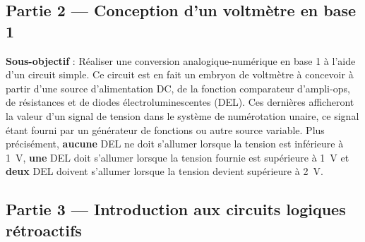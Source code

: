\documentclass[canadien,12pt,oneside,letterpaper]{article}
\begin{document}
%

\subsection{Partie 2 --- Conception d'un voltmètre en base 1}

\noindent\textbf{Sous-objectif} : Réaliser une conversion analogique-numérique en base 1 à l'aide d'un circuit simple. Ce circuit est en fait un embryon de voltmètre à concevoir à partir d'une source d'alimentation DC, de la fonction comparateur d'ampli-ops, de résistances et de diodes électroluminescentes (DEL). Ces dernières afficheront la valeur d'un signal de tension dans le système de numérotation unaire, ce signal étant fourni par un générateur de fonctions ou autre source variable. Plus précisément, \textbf{aucune} DEL ne doit s'allumer lorsque la tension est inférieure à 1~V, \textbf{une} DEL doit s'allumer lorsque la tension fournie est supérieure à 1~V et \textbf{deux} DEL doivent s'allumer lorsque la tension devient supérieure à 2~V.

\subsection{Partie 3 --- Introduction aux circuits logiques rétroactifs}
\end{document}
